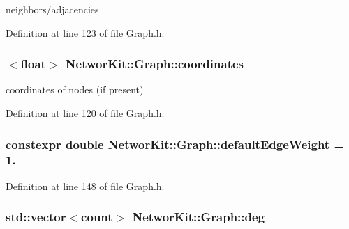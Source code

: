 neighbors/adjacencies 



Definition at line 123 of file Graph.\-h.

\hypertarget{class_networ_kit_1_1_graph_adf7947ed51f224eaeae0c07a8aaedeae}{
\subsubsection[{coordinates}]{$<$float$>$ Networ\-Kit\-::\-Graph\-::coordinates\hspace{0.3cm}{\ttfamily [protected]}}}\label{class_networ_kit_1_1_graph_adf7947ed51f224eaeae0c07a8aaedeae}


coordinates of nodes (if present) 



Definition at line 120 of file Graph.\-h.

\hypertarget{class_networ_kit_1_1_graph_af32663b9ad67bae546281e7725db3519}{
\subsubsection[{default\-Edge\-Weight}]{\setlength{\rightskip}{0pt plus 5cm}constexpr double Networ\-Kit\-::\-Graph\-::default\-Edge\-Weight = 1.\hspace{0.3cm}{\ttfamily [static]}}}\label{class_networ_kit_1_1_graph_af32663b9ad67bae546281e7725db3519}


Definition at line 148 of file Graph.\-h.

\hypertarget{class_networ_kit_1_1_graph_a264a36a2017c51a1c3f71e7429e47b22}{
\subsubsection[{deg}]{\setlength{\rightskip}{0pt plus 5cm}std\-::vector$<${\bf count}$>$ Networ\-Kit\-::\-Graph\-::deg\hspace{0.3cm}{\ttfamily [protected]}}}\label{class_networ_kit_1_1_graph_a264a36a2017c51a1c3f71e7429e47b22}



